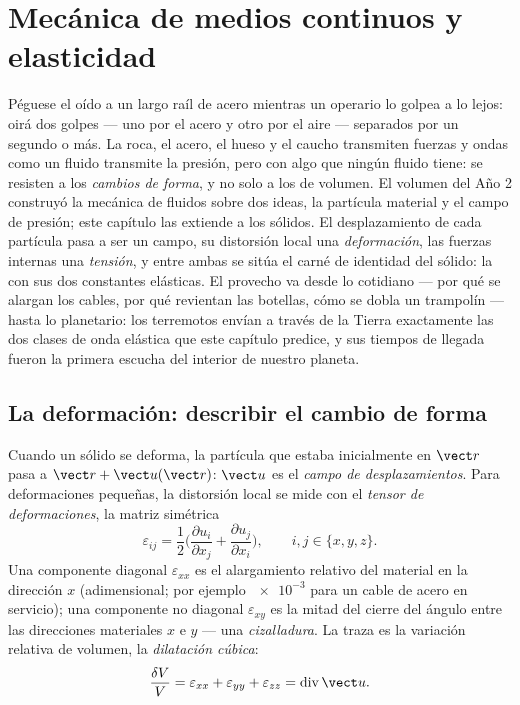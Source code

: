 \chapter{Mecánica de medios continuos y elasticidad}\label{ch:b3:continuum-elasticity}

Péguese el oído a un largo raíl de acero mientras un operario lo golpea a lo
lejos: oirá dos golpes --- uno por el acero y otro por el aire ---
separados por un segundo o más. La roca, el acero, el hueso y el caucho
transmiten fuerzas y ondas como un fluido transmite la presión, pero con
algo que ningún fluido tiene: se resisten a los \emph{cambios de forma}, y
no solo a los de volumen. El volumen del Año 2 construyó la mecánica de
fluidos sobre dos ideas, la partícula material y el campo de presión; este
capítulo las extiende a los sólidos. El desplazamiento de cada partícula
pasa a ser un campo, su distorsión local una \emph{deformación}, las fuerzas
internas una \emph{tensión}, y entre ambas se sitúa el carné de identidad
del sólido: la  con sus dos constantes elásticas. El provecho va
desde lo cotidiano --- por qué se alargan los cables, por qué revientan las
botellas, cómo se dobla un trampolín --- hasta lo planetario: los terremotos
envían a través de la Tierra exactamente las dos clases de onda elástica que
este capítulo predice, y sus tiempos de llegada fueron la primera escucha
del interior de nuestro planeta.

\section{La deformación: describir el cambio de forma}

\begin{definition}\label{def:b3:continuum-elasticity:strain}
Cuando un sólido se deforma, la partícula que estaba inicialmente en
$\vect r$ pasa a $\vect r + \vect u(\vect r)$: $\vect u$ es el \emph{campo
de desplazamientos}. Para deformaciones pequeñas, la distorsión local se
mide con el \emph{tensor de deformaciones}, la matriz simétrica
\[
\varepsilon_{ij} = \frac12\Big(
 \frac{\partial u_i}{\partial x_j} + \frac{\partial u_j}{\partial x_i}
\Big) , \qquad i, j \in \{x, y, z\} .
\]
Una componente diagonal $\varepsilon_{xx}$ es el alargamiento relativo del
material en la dirección $x$ (adimensional; por ejemplo $\num{e-3}$ para un
cable de acero en servicio); una componente no diagonal $\varepsilon_{xy}$
es la mitad del cierre del ángulo entre las direcciones materiales $x$ e $y$
--- una \emph{cizalladura}. La traza es la variación relativa de volumen, la
\emph{dilatación cúbica}:
\[
\frac{\delta V}{V} = \varepsilon_{xx} + \varepsilon_{yy} +
\varepsilon_{zz} = \operatorname{div}\vect u .
\]
\end{definition}

